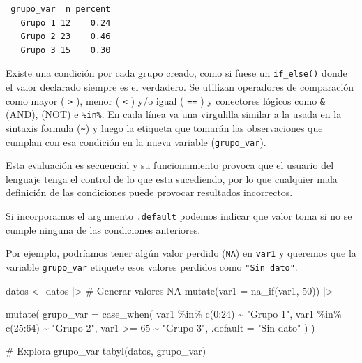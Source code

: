 \documentclass[
  spanish,
  a4paper,
]{scrbook}
\newenvironment{Shaded}{\begin{snugshade}}{\end{snugshade}}
\newcommand{\AttributeTok}[1]{\textcolor[rgb]{0.40,0.45,0.13}{#1}}
\newcommand{\CommentTok}[1]{\textcolor[rgb]{0.37,0.37,0.37}{#1}}
\newcommand{\DecValTok}[1]{\textcolor[rgb]{0.68,0.00,0.00}{#1}}
\newcommand{\FunctionTok}[1]{\textcolor[rgb]{0.28,0.35,0.67}{#1}}
\newcommand{\NormalTok}[1]{\textcolor[rgb]{0.00,0.23,0.31}{#1}}
\newcommand{\OtherTok}[1]{\textcolor[rgb]{0.00,0.23,0.31}{#1}}
\newcommand{\SpecialCharTok}[1]{\textcolor[rgb]{0.37,0.37,0.37}{#1}}
\newcommand{\StringTok}[1]{\textcolor[rgb]{0.13,0.47,0.30}{#1}}
\begin{document}
\begin{verbatim}
 grupo_var  n percent
   Grupo 1 12    0.24
   Grupo 2 23    0.46
   Grupo 3 15    0.30
\end{verbatim}

Existe una condición por cada grupo creado, como si fuese un
\texttt{if\_else()} donde el valor declarado siempre es el verdadero. Se
utilizan operadores de comparación como mayor ( \texttt{\textgreater{}}
), menor ( \texttt{\textless{}} ) y/o igual ( \texttt{==} ) y conectores
lógicos como \texttt{\&} (AND), \texttt{\textbar{}} (NOT) e
\texttt{\%in\%}. En cada línea va una virgulilla similar a la usada en
la sintaxis formula (\texttt{\textasciitilde{}}) y luego la etiqueta que
tomarán las observaciones que cumplan con esa condición en la nueva
variable (\texttt{grupo\_var}).

Esta evaluación es secuencial y su funcionamiento provoca que el usuario
del lenguaje tenga el control de lo que esta sucediendo, por lo que
cualquier mala definición de las condiciones puede provocar resultados
incorrectos.

Si incorporamos el argumento \texttt{.default} podemos indicar que valor
toma si no se cumple ninguna de las condiciones anteriores.

Por ejemplo, podríamos tener algún valor perdido (\texttt{NA}) en
\texttt{var1} y queremos que la variable \texttt{grupo\_var} etiquete
esos valores perdidos como \texttt{"Sin\ dato"}.

\begin{Shaded}
\begin{Highlighting}[]
\NormalTok{datos }\OtherTok{\textless{}{-}}\NormalTok{ datos }\SpecialCharTok{|\textgreater{}}
  \CommentTok{\# Generar valores NA}
  \FunctionTok{mutate}\NormalTok{(}\AttributeTok{var1 =} \FunctionTok{na\_if}\NormalTok{(var1, }\DecValTok{50}\NormalTok{)) }\SpecialCharTok{|\textgreater{}}

  \FunctionTok{mutate}\NormalTok{(}
    \AttributeTok{grupo\_var =} \FunctionTok{case\_when}\NormalTok{(}
\NormalTok{      var1 }\SpecialCharTok{\%in\%} \FunctionTok{c}\NormalTok{(}\DecValTok{0}\SpecialCharTok{:}\DecValTok{24}\NormalTok{) }\SpecialCharTok{\textasciitilde{}} \StringTok{"Grupo 1"}\NormalTok{,}
\NormalTok{      var1 }\SpecialCharTok{\%in\%} \FunctionTok{c}\NormalTok{(}\DecValTok{25}\SpecialCharTok{:}\DecValTok{64}\NormalTok{) }\SpecialCharTok{\textasciitilde{}} \StringTok{"Grupo 2"}\NormalTok{,}
\NormalTok{      var1 }\SpecialCharTok{\textgreater{}=} \DecValTok{65} \SpecialCharTok{\textasciitilde{}} \StringTok{"Grupo 3"}\NormalTok{,}
      \AttributeTok{.default =} \StringTok{"Sin dato"}
\NormalTok{    )}
\NormalTok{  )}

\CommentTok{\# Explora grupo\_var}
\FunctionTok{tabyl}\NormalTok{(datos, grupo\_var)}
\end{Highlighting}
\end{Shaded}
\end{document}
